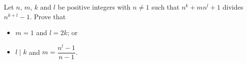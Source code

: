 Let $n$, $m$, $k$ and $l$ be positive integers with $n \neq 1$ such that $n^k + mn^l + 1$ divides $n^{k+l} - 1$. Prove that
\begin{itemize}
  \item $m = 1$ and $l = 2k$; or
  \item $l \mid k$ and $m = \dfrac{n^l - 1}{n - 1}$.
\end{itemize}
